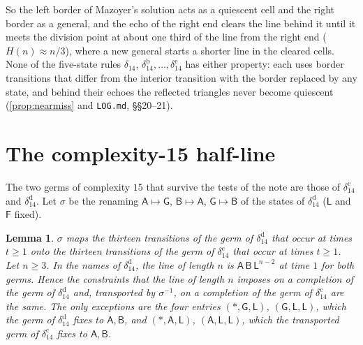\documentclass[11pt]{article}
\newtheorem{lemma}[theorem]{Lemma}
\theoremstyle{definition}
\theoremstyle{remark}
\newcommand{\Lq}{\mathsf L}
\newcommand{\Gq}{\mathsf G}
\newcommand{\Aq}{\mathsf A}
\newcommand{\Bq}{\mathsf B}
\newcommand{\Fq}{\mathsf F}
\begin{document}
So the left border of Mazoyer's solution acts as a quiescent cell and the right
border as a general, and the echo of the right end clears the line behind it
until it meets the division point at about one third of the line from the right
end ($H(n)\approx n/3$), where a new general starts a shorter line in the
cleared cells. None of the five-state rules $\delta_{14}$,
$\delta_{14}^{\mathrm b},\dots,\delta_{14}^{\mathrm e}$ has either property: each
uses border transitions that differ from the interior transition with the
border replaced by any state, and behind their echoes the reflected triangles
never become quiescent (\cref{prop:nearmiss} and \texttt{LOG.md}, \S\S20--21).

\section{The complexity-15 half-line}\label{sec:labellings}

The two germs of complexity $15$ that survive the tests of the note are those of
$\delta_{14}^{\mathrm c}$ and $\delta_{14}^{\mathrm d}$. Let $\sigma$ be the
renaming $\Aq\mapsto\Gq$, $\Bq\mapsto\Aq$, $\Gq\mapsto\Bq$ of the states of
$\delta_{14}^{\mathrm d}$ ($\Lq$ and $\Fq$ fixed).

\begin{lemma}\label{lem:labellings}
$\sigma$ maps the thirteen transitions of the germ of $\delta_{14}^{\mathrm d}$
that occur at times $t\ge1$ onto the thirteen transitions of the germ of
$\delta_{14}^{\mathrm c}$ that occur at times $t\ge1$. Let $n\ge3$. In the names
of $\delta_{14}^{\mathrm d}$, the line of length $n$ is $\Aq\,\Bq\,\Lq^{n-2}$ at
time $1$ for both germs. Hence the constraints that the line of length $n$
imposes on a completion of the germ of $\delta_{14}^{\mathrm d}$ and,
transported by $\sigma^{-1}$, on a completion of the germ of
$\delta_{14}^{\mathrm c}$ are the same. The only exceptions are the four entries
$(\ast,\Gq,\Lq)$, $(\Gq,\Lq,\Lq)$, which the germ of $\delta_{14}^{\mathrm d}$
fixes to $\Aq,\Bq$, and $(\ast,\Aq,\Lq)$, $(\Aq,\Lq,\Lq)$, which the transported
germ of $\delta_{14}^{\mathrm c}$ fixes to $\Aq,\Bq$.
\end{lemma}
\end{document}
